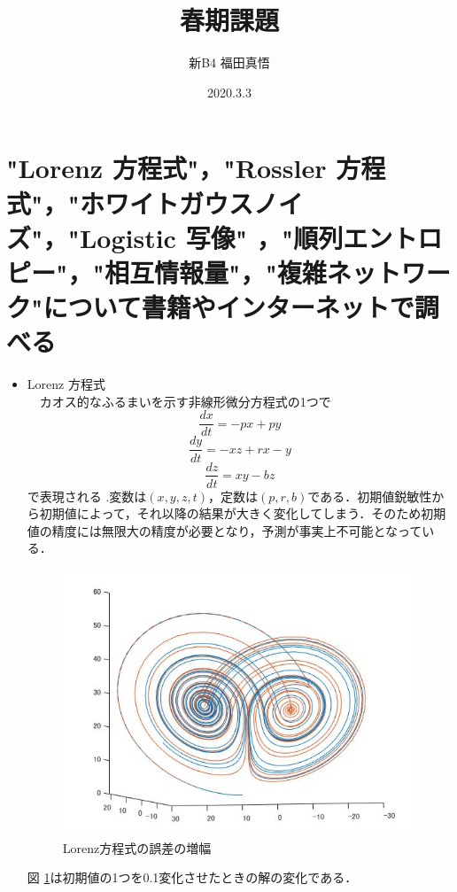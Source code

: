 \documentclass[autodetect-engine,dvipdfmx-if-dvi,ja=standard,a4paper,11pt]{bxjsarticle} %
\title{春期課題} %
\author{新B4 福田真悟} %
\date{2020.3.3}%
\begin{document}
\maketitle %
\section{\normalsize"Lorenz 方程式"，"Rossler 方程式"，"ホワイトガウスノイズ"，"Logistic 写像"
，"順列エントロピー"，"相互情報量"，"複雑ネットワーク"について書籍やインターネットで調べる
}%


\begin{itemize}
\item Lorenz 方程式\\%
　カオス的なふるまいを示す非線形微分方程式の1つで
\begin{equation}
\frac{dx}{dt}=-px+py
\end{equation}
\begin{equation}
\frac{dy}{dt}=-xz+rx-y
\end{equation}
\begin{equation}
\frac{dz}{dt}=xy-bz
\end{equation}
で表現される \cite{lo} .変数は$(x,y,z,t)$，定数は$(p,r,b)$である．初期値鋭敏性から初期値によって，それ以降の結果が大きく変化してしまう．そのため初期値の精度には無限大の精度が必要となり，予測が事実上不可能となっている．

\begin{figure}[H]%
\begin{center}

\includegraphics[width=.4\textwidth]{Lorenz_result.jpg}
\end{center}
\caption{Lorenz方程式の誤差の増幅}%
\label{fig:lorenz}
\end{figure}

図 \ref{fig:lorenz}は初期値の1つを0.1変化させたときの解の変化である．\\


\end{itemize}
\end{document}
